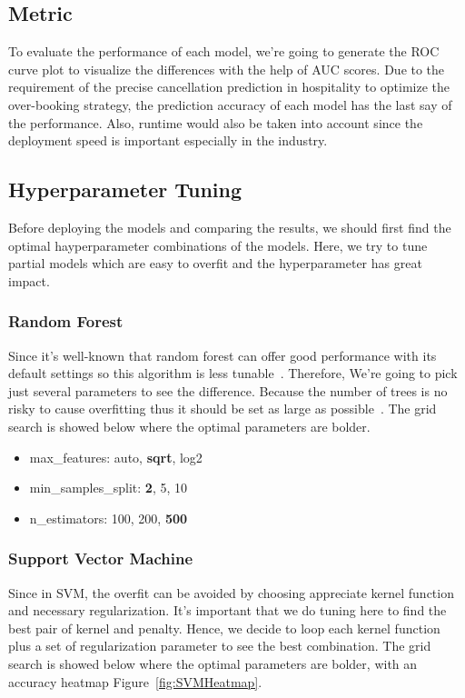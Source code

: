 \documentclass[10pt,twocolumn,letterpaper]{article}
\begin{document}
\subsection{Metric}

To evaluate the performance of each model, we're going to generate the ROC curve plot to visualize the differences with the help of AUC scores. Due to the requirement of the precise cancellation prediction in hospitality to optimize the over-booking strategy, the prediction accuracy of each model has the last say of the performance. Also, runtime would also be taken into account since the deployment speed is important especially in the industry.

\subsection{Hyperparameter Tuning}
Before deploying the models and comparing the results, we should first find the optimal hayperparameter combinations of the models. Here, we try to tune partial models which are easy to overfit and the hyperparameter has great impact. 


\subsubsection{Random Forest}
Since it's well-known that random forest can offer good performance with its default settings so this algorithm is less tunable~\cite{Probst_2019}. Therefore, We're going to pick just several parameters to see the difference. Because the number of trees is no risky to cause overfitting thus it should be set as large as possible~\cite{probst2017tune}. The grid search is showed below where the optimal parameters are bolder.

\begin{itemize}
    \item max\_features: auto, \textbf{sqrt}, log2
    \item min\_samples\_split: \textbf{2}, 5, 10
    \item n\_estimators: 100, 200, \textbf{500}
\end{itemize}


\subsubsection{Support Vector Machine}
Since in SVM, the overfit can be avoided by choosing appreciate kernel function and necessary regularization. It's important that we do tuning here to find the best pair of kernel and penalty. Hence, we decide to loop each kernel function plus a set of regularization parameter to see the best combination. The grid search is showed below where the optimal parameters are bolder, with an accuracy heatmap Figure~\ref{fig:SVMHeatmap}.
\end{document}
